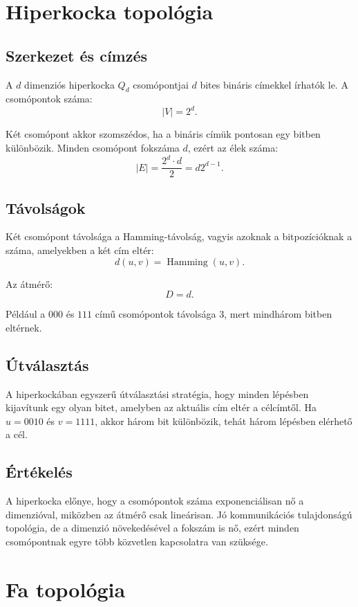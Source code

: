 \section{Hiperkocka topológia}

\subsection{Szerkezet és címzés}

A $d$ dimenziós hiperkocka $Q_d$ csomópontjai $d$ bites bináris címekkel írhatók le. A csomópontok száma:
\[
  |V|=2^d.
\]

Két csomópont akkor szomszédos, ha a bináris címük pontosan egy bitben különbözik. Minden csomópont fokszáma $d$, ezért az élek száma:
\[
  |E|=\frac{2^d\cdot d}{2}=d2^{d-1}.
\]

\subsection{Távolságok}

Két csomópont távolsága a Hamming-távolság, vagyis azoknak a bitpozícióknak a száma, amelyekben a két cím eltér:
\[
  d(u,v)=\operatorname{Hamming}(u,v).
\]

Az átmérő:
\[
  D=d.
\]

Például a $000$ és $111$ című csomópontok távolsága $3$, mert mindhárom bitben eltérnek.

\subsection{Útválasztás}

A hiperkockában egyszerű útválasztási stratégia, hogy minden lépésben kijavítunk egy olyan bitet, amelyben az aktuális cím eltér a célcímtől. Ha $u=0010$ és $v=1111$, akkor három bit különbözik, tehát három lépésben elérhető a cél.

\subsection{Értékelés}

A hiperkocka előnye, hogy a csomópontok száma exponenciálisan nő a dimenzióval, miközben az átmérő csak lineárisan. Jó kommunikációs tulajdonságú topológia, de a dimenzió növekedésével a fokszám is nő, ezért minden csomópontnak egyre több közvetlen kapcsolatra van szüksége.

\section{Fa topológia}

